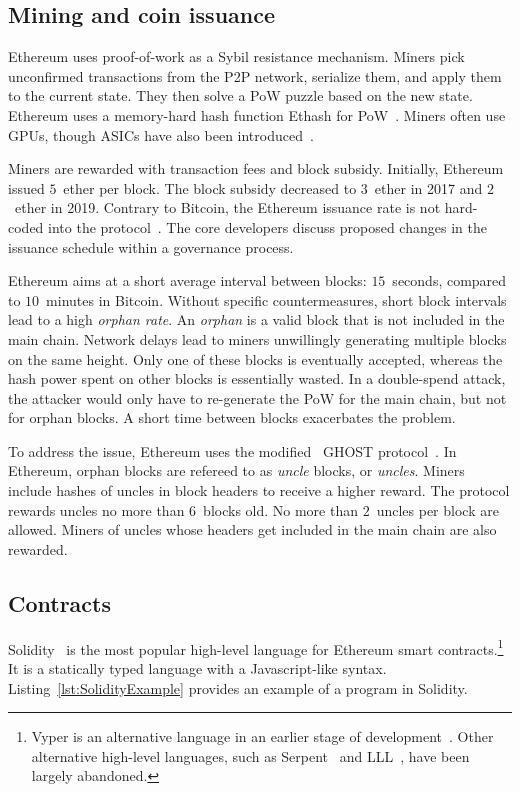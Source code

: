 \subsection{Mining and coin issuance}

Ethereum uses proof-of-work as a Sybil resistance mechanism.
Miners pick unconfirmed transactions from the P2P network, serialize them, and apply them to the current state.
They then solve a PoW puzzle based on the new state.
Ethereum uses a memory-hard hash function Ethash for PoW~\cite{Ethash}.
Miners often use GPUs, though ASICs have also been introduced~\cite{OLeary2018}.

Miners are rewarded with transaction fees and block subsidy.
Initially, Ethereum issued $5$~ether per block.
The block subsidy decreased to $3$~ether in 2017 and $2$~ether in 2019.
Contrary to Bitcoin, the Ethereum issuance rate is not hard-coded into the protocol~\cite{Ethhub2020}.
The core developers discuss proposed changes in the issuance schedule within a governance process.

Ethereum aims at a short average interval between blocks: $15$~seconds, compared to $10$~minutes in Bitcoin.
Without specific countermeasures, short block intervals lead to a high \textit{orphan rate}.
An \textit{orphan} is a valid block that is not included in the main chain.
Network delays lead to miners unwillingly generating multiple blocks on the same height.
Only one of these blocks is eventually accepted, whereas the hash power spent on other blocks is essentially wasted.
In a double-spend attack, the attacker would only have to re-generate the PoW for the main chain, but not for orphan blocks.
A short time between blocks exacerbates the problem.

To address the issue, Ethereum uses the modified~\cite{Lewenberg2015} GHOST protocol~\cite{Sompolinsky2013, EthdocsMining}.
In Ethereum, orphan blocks are refereed to as \textit{uncle} blocks, or \textit{uncles}.
Miners include hashes of uncles in block headers to receive a higher reward.
The protocol rewards uncles no more than $6$~blocks old.
No more than $2$~uncles per block are allowed.
Miners of uncles whose headers get included in the main chain are also rewarded.


\subsection{Contracts}

Solidity~\cite{Solidity2017} is the most popular high-level language for Ethereum smart contracts.\footnote{Vyper is an alternative language in an earlier stage of development~\cite{Vyper}. Other alternative high-level languages, such as Serpent~\cite{SerpentGithub} and LLL~\cite{Ellison2017}, have been largely abandoned.}
It is a statically typed language with a Javascript-like syntax.
Listing~\ref{lst:SolidityExample} provides an example of a program in Solidity.

